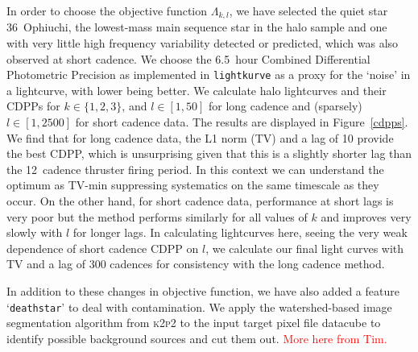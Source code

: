 \documentclass[modern]{aastex62}
\begin{document}

In order to choose the objective function $\Lambda_{k,l}$, we have selected the quiet star 36~Ophiuchi, the lowest-mass main sequence star in the halo sample and one with very little high frequency variability detected or predicted, which was also observed at short cadence. We choose the 6.5~hour Combined Differential Photometric Precision \citep[CDPP,][]{cdpp} as implemented in \texttt{lightkurve} \citep{lightkurve} as a proxy for the `noise' in a lightcurve, with lower being better. We calculate halo lightcurves and their CDPPs for $k \in \{1,2,3\}$, and $l \in [1,50]$ for long cadence and (sparsely) $l \in [1,2500]$ for short cadence data. The results are displayed in Figure~\ref{cdpps}. We find that for long cadence data, the L1 norm (TV) and a lag of 10 provide the best CDPP, which is unsurprising given that this is a slightly shorter lag than the 12~cadence thruster firing period. In this context we can understand the optimum as TV-min suppressing systematics on the same timescale as they occur. On the other hand, for short cadence data, performance at short lags is very poor but the method performs similarly for all values of $k$ and improves very slowly with $l$ for longer lags. In calculating lightcurves here, seeing the very weak dependence of short cadence CDPP on $l$, we calculate our final light curves with TV and a lag of 300 cadences for consistency with the long cadence method.

\begin{figure*}
\caption{Behaviour of long cadence (left) and short cadence (right) 6.5~hour CDPP for the quiet dwarf 36~Ophiuchi as a function of lag parameter $l$. For long cadence this shows a minimum for L1 norm and $l=10$, i.e. for objective function $\Lambda_{1,10}$. For short cadence CDPP continuously improves for higher lags and shows no strong differences between L1, L2 or~L3 norms.}
\label{cdpps}
\end{figure*}


In addition to these changes in objective function, we have also added a feature `\texttt{deathstar}' to deal with contamination. We apply the watershed-based image segmentation algorithm from \textsc{k2p2} \citep{k2p2} to the input target pixel file datacube to identify possible background sources and cut them out. \textcolor{red}{More here from Tim.}
\end{document}
